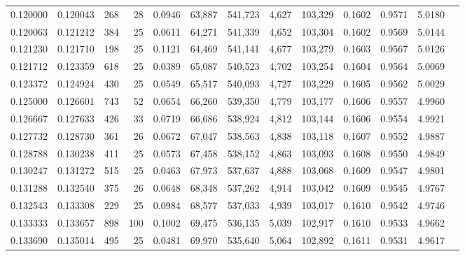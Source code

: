 \begin{tabular}{rrrrrrrrrrrrr}
0.120000 & 0.120043 &    268 &    28 &                                     0.0946 &  63,887 & 541,723 &   4,627 & 103,329 & 0.1602 & 0.9571 & 5.0180 \\
0.120063 & 0.121212 &    384 &    25 &                                     0.0611 &  64,271 & 541,339 &   4,652 & 103,304 & 0.1602 & 0.9569 & 5.0144 \\
0.121230 & 0.121710 &    198 &    25 &                                     0.1121 &  64,469 & 541,141 &   4,677 & 103,279 & 0.1603 & 0.9567 & 5.0126 \\
0.121712 & 0.123359 &    618 &    25 &                                     0.0389 &  65,087 & 540,523 &   4,702 & 103,254 & 0.1604 & 0.9564 & 5.0069 \\
0.123372 & 0.124924 &    430 &    25 &                                     0.0549 &  65,517 & 540,093 &   4,727 & 103,229 & 0.1605 & 0.9562 & 5.0029 \\
0.125000 & 0.126601 &    743 &    52 &                                     0.0654 &  66,260 & 539,350 &   4,779 & 103,177 & 0.1606 & 0.9557 & 4.9960 \\
0.126667 & 0.127633 &    426 &    33 &                                     0.0719 &  66,686 & 538,924 &   4,812 & 103,144 & 0.1606 & 0.9554 & 4.9921 \\
0.127732 & 0.128730 &    361 &    26 &                                     0.0672 &  67,047 & 538,563 &   4,838 & 103,118 & 0.1607 & 0.9552 & 4.9887 \\
0.128788 & 0.130238 &    411 &    25 &                                     0.0573 &  67,458 & 538,152 &   4,863 & 103,093 & 0.1608 & 0.9550 & 4.9849 \\
0.130247 & 0.131272 &    515 &    25 &                                     0.0463 &  67,973 & 537,637 &   4,888 & 103,068 & 0.1609 & 0.9547 & 4.9801 \\
0.131288 & 0.132540 &    375 &    26 &                                     0.0648 &  68,348 & 537,262 &   4,914 & 103,042 & 0.1609 & 0.9545 & 4.9767 \\
0.132543 & 0.133308 &    229 &    25 &                                     0.0984 &  68,577 & 537,033 &   4,939 & 103,017 & 0.1610 & 0.9542 & 4.9746 \\
0.133333 & 0.133657 &    898 &   100 &                                     0.1002 &  69,475 & 536,135 &   5,039 & 102,917 & 0.1610 & 0.9533 & 4.9662 \\
0.133690 & 0.135014 &    495 &    25 &                                     0.0481 &  69,970 & 535,640 &   5,064 & 102,892 & 0.1611 & 0.9531 & 4.9617 \\

\end{tabular}

